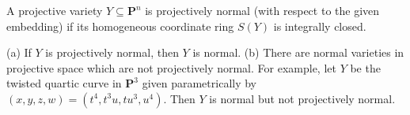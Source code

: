 A projective variety $Y \subseteq \mathbf{P}^n$ is projectively normal (with respect to the given embedding) if its homogeneous coordinate ring $S(Y)$ is integrally closed.

(a) If $Y$ is projectively normal, then $Y$ is normal.
(b) There are normal varieties in projective space which are not projectively normal. For example, let $Y$ be the twisted quartic curve in $\mathbf{P}^3$ given parametrically by $(x, y, z, w) = (t^4, t^3u, tu^3, u^4)$. Then $Y$ is normal but not projectively normal.

